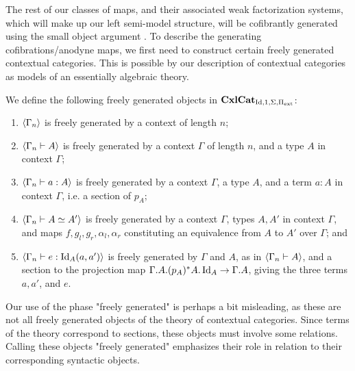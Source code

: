 \documentclass{amsart}
\begin{document}
The rest of our classes of maps, and their associated weak factorization systems, which will make up our left semi-model structure, will be cofibrantly generated using the small object argument \cite{Quillen}. To describe the generating cofibrations/anodyne maps, we first need to construct certain freely generated contextual categories. This is possible by our description of contextual categories as models of an essentially algebraic theory.
\begin{defn}
    We define the following freely generated objects in $\operatorname{\mathbf{CxlCat}}_{\operatorname{Id},1,\Sigma,\Pi_{\operatorname{ext}}}$:
    \begin{enumerate}
        \item $\langle\Gamma_n\rangle$ is freely generated by a context of length $n$;
        \item $\langle\Gamma_n\vdash A\rangle$ is freely generated by a context $\Gamma$ of length $n$, and a type $A$ in context $\Gamma$;
        \item $\langle\Gamma_n\vdash a:A\rangle$ is freely generated by a context $\Gamma$, a type $A$, and a term $a:A$ in context $\Gamma$, i.e. a section of $p_A$;
        \item $\langle\Gamma_n\vdash A\simeq A'\rangle$ is freely generated by a context $\Gamma$, types $A,A'$ in context $\Gamma$, and maps $f,g_l,g_r,\alpha_l,\alpha_r$ constituting an equivalence from $A$ to $A'$ over $\Gamma$; and
        \item $\langle\Gamma_n\vdash e:\operatorname{Id}_A(a,a')\rangle$ is freely generated by $\Gamma$ and $A$, as in $\langle\Gamma_n\vdash A\rangle$, and a section to the projection map $\Gamma.A.(p_A)^*A.\operatorname{Id}_A\to\Gamma.A$, giving the three terms $a,a'$, and $e$.
    \end{enumerate}
\end{defn}
\begin{rem}
    Our use of the phase "freely generated" is perhaps a bit misleading, as these are not all freely generated objects of the theory of contextual categories. Since terms of the theory correspond to sections, these objects must involve some relations. Calling these objects "freely generated" emphasizes their role in relation to their corresponding syntactic objects.
\end{rem}
\end{document}
